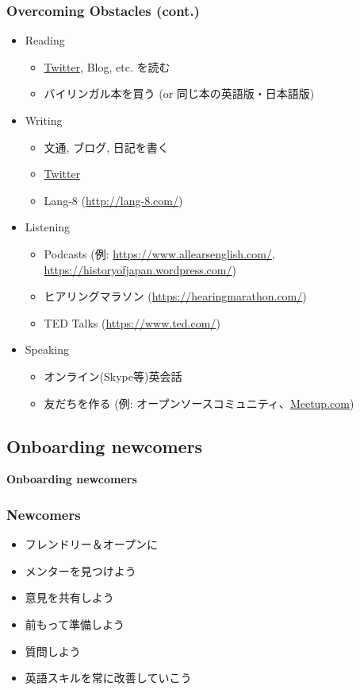 \documentclass[aspectratio=169,11pt,hyperref={colorlinks=true}]{beamer}
\begin{document}
\begin{frame}
\frametitle{Overcoming Obstacles (cont.)}
  \begin{itemize}
  \item[] Reading
    \begin{itemize}
    \item \href{https://twitter.com}{Twitter}, Blog, etc. を読む
    \item バイリンガル本を買う (or 同じ本の英語版・日本語版)
    \end{itemize}
  \item[] Writing
    \begin{itemize}
    \item 文通, ブログ, 日記を書く
    \item \href{https://twitter.com}{Twitter}
    \item Lang-8 (\url{http://lang-8.com/})
    \end{itemize}
  \item[] Listening
    \begin{itemize}
    \item Podcasts (例: \url{https://www.allearsenglish.com/}, \url{https://historyofjapan.wordpress.com/})
    \item ヒアリングマラソン (\url{https://hearingmarathon.com/})
    \item TED Talks (\url{https://www.ted.com/})
    \end{itemize}
  \item[] Speaking
    \begin{itemize}
    \item オンライン(Skype等)英会話
    \item 友だちを作る (例: オープンソースコミュニティ、\href{https://www.meetup.com/meetup-group-en-jp/}{Meetup.com})
    \end{itemize}
  \end{itemize}
\end{frame}


\subsection{Onboarding newcomers}
\begin{frame}
  \bf\Huge{Onboarding newcomers}
\end{frame}

\begin{frame}
\frametitle{Newcomers}
  \begin{itemize}
  \item フレンドリー＆オープンに
  \item メンターを見つけよう
  \item 意見を共有しよう
  \item 前もって準備しよう
  \item 質問しよう
  \item 英語スキルを常に改善していこう
  \end{itemize}
\end{frame}
\end{document}
